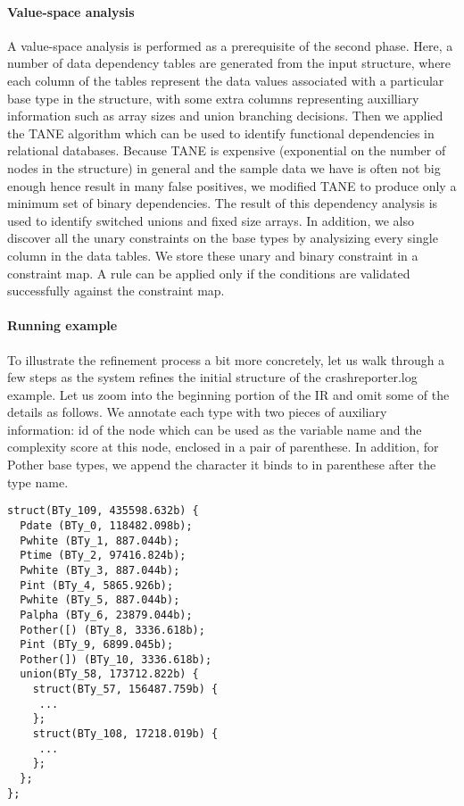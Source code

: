 \paragraph*{Value-space analysis}
A value-space analysis is performed as a prerequisite of the second phase.
Here, a number of data dependency tables are generated from the 
input structure, where each
column of the tables represent the data values associated with a particular base type 
in the structure, with some extra columns representing auxilliary information such as
array sizes and union branching decisions. Then we applied the TANE algorithm \cite{TANE-HKPT99}
which can be used to identify functional dependencies in relational databases.
Because TANE is expensive (exponential on the number of nodes in the structure) 
in general and the sample data we have is often not big enough hence 
result in many false positives, we modified TANE to produce only a minimum set 
of binary dependencies. The result of this dependency analysis is used to 
identify switched unions and fixed size arrays.
In addition, we also discover all the unary constraints on the base types by
analysizing every single column in the data tables. We store these unary and
binary constraint in a constraint map.  A rule can be applied 
only if the conditions are validated successfully
against the constraint map. 

\paragraph*{Running example}
To illustrate the refinement process a bit more concretely, let us walk through
a few steps as the system refines the initial structure of the crashreporter.log example.
Let us zoom into the beginning portion of the IR and omit some of the details as follows. 
We annotate each type with two pieces of auxiliary information: id of the node which
can be used as the variable name and the complexity score at this node, 
enclosed in a pair of parenthese. In addition, for Pother base types,
we append the character it binds to in parenthese after the type name.

\begin{verbatim}
struct(BTy_109, 435598.632b) {
  Pdate (BTy_0, 118482.098b);
  Pwhite (BTy_1, 887.044b);
  Ptime (BTy_2, 97416.824b);
  Pwhite (BTy_3, 887.044b);
  Pint (BTy_4, 5865.926b);
  Pwhite (BTy_5, 887.044b);
  Palpha (BTy_6, 23879.044b);
  Pother([) (BTy_8, 3336.618b);
  Pint (BTy_9, 6899.045b);
  Pother(]) (BTy_10, 3336.618b);
  union(BTy_58, 173712.822b) {
    struct(BTy_57, 156487.759b) {
     ...
    };
    struct(BTy_108, 17218.019b) {
     ...
    };
  };
};
\end{verbatim}


